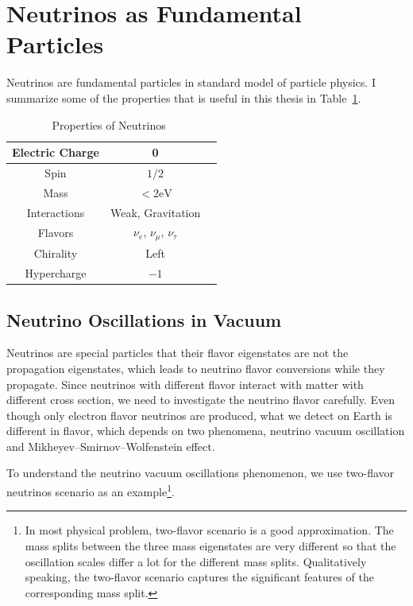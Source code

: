 \section{\label{chap:basics-section:neutrinos}Neutrinos as Fundamental Particles}

Neutrinos are fundamental particles in standard model of particle physics. I summarize some of the properties that is useful in this thesis in Table~\ref{table:neutrino-properties}.

\begin{table}[ht]
\centering
 \begin{tabular}{|c | c | c|} 
 \hline
  Electric Charge & 0\\
  \hline
  Spin & $1/2$ \\
\hline
 Mass & $<2\mathrm{eV}$  \\
 \hline
 Interactions & Weak, Gravitation  \\
 \hline
 Flavors & $\nu_e$, $\nu_\mu$, $\nu_\tau$ \\ 
 \hline
 Chirality & Left \\
 \hline
 Hypercharge & $-1$ \\
 \hline
 
 \end{tabular}
 \caption{Properties of Neutrinos~\cite{Patrignani:2016xqp}}
\label{table:neutrino-properties}
\end{table}


\subsection{Neutrino Oscillations in Vacuum}

Neutrinos are special particles that their flavor eigenstates are not the propagation eigenstates, which leads to neutrino flavor conversions while they propagate. Since neutrinos with different flavor interact with matter with different cross section, we need to investigate the neutrino flavor carefully. Even though only electron flavor neutrinos are produced, what we detect on Earth is different in flavor, which depends on two phenomena, neutrino vacuum oscillation and Mikheyev–Smirnov–Wolfenstein effect.


To understand the neutrino vacuum oscillations phenomenon, we use two-flavor neutrinos scenario as an example\footnote{In most physical problem, two-flavor scenario is a good approximation. The mass splits between the three mass eigenstates are very different so that the oscillation scales differ a lot for the different mass splits. Qualitatively speaking, the two-flavor scenario captures the significant features of the corresponding mass split.}.


